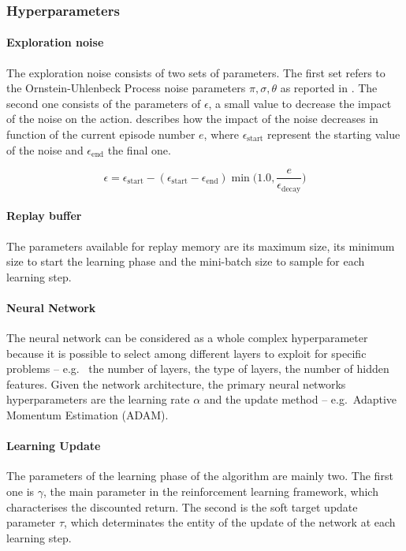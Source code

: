 \subsubsection{Hyperparameters} \label{hpddpg}

\paragraph{Exploration noise} The exploration noise consists of two sets of parameters. The first set refers to the Ornstein-Uhlenbeck Process noise parameters $\pi, \sigma, \theta$ as reported in \cite{uhlenbeck1930theory}. The second one consists of the parameters of $\epsilon$, a small value to decrease the impact of the noise on the action.  describes how the impact of the noise decreases in function of the current episode number $e$, where $\epsilon_{\text{start}}$ represent the starting value of the noise and $\epsilon_{\text{end}}$ the final one.

\begin{equation} \label{eq:epsilon}
\epsilon = \epsilon_{\text{start}} - (\epsilon_{\text{start}} -\epsilon_{\text{end}}) \min\Bigg(1.0, \frac{e}{\epsilon_{\text{decay}}}\Bigg)
\end{equation}

\paragraph{Replay buffer} The parameters available for replay memory are its maximum size, its minimum size to start the learning phase and the mini-batch size to sample for each learning step.

\paragraph{Neural Network} The neural network can be considered as a whole complex hyperparameter because it is possible to select among different layers to exploit for specific problems -- e.g. \ the number of layers, the type of layers, the number of hidden features. Given the network architecture, the primary neural networks hyperparameters are the learning rate $\alpha$ and the update method -- e.g.\ Adaptive Momentum Estimation (ADAM).

\paragraph{Learning Update} The parameters of the learning phase of the algorithm are mainly two. The first one is $\gamma$, the main parameter in the reinforcement learning framework, which characterises the discounted return. The second is the soft target update parameter $\tau$, which determinates the entity of the update of the network at each learning step.

